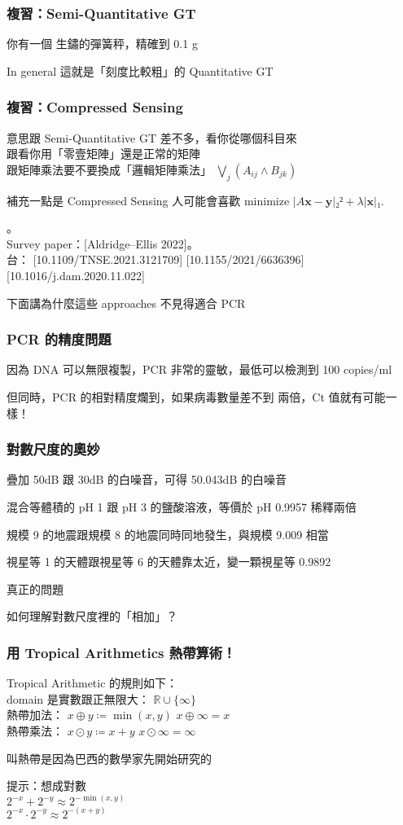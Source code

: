 \documentclass[12pt,aspectratio=1610]{beamer}
\def\pp{\pause\par}
\begin{document}
\begin{frame}\frametitle{複習：Semi-Quantitative GT}
	你有一個 \alert{生鏽的彈簧秤}，精確到 0.1 g
	\pp
	In general 這就是「刻度比較粗」的 Quantitative GT
	\par
	[Emad--Milenkovic 2014] [Cheraghchi--Gabrys--Milenkovic 2021]
\end{frame}

\begin{frame}\frametitle{複習：Compressed Sensing}
	意思跟 Semi-Quantitative GT 差不多，看你從哪個科目來 \\
	跟看你用「零壹矩陣」還是正常的矩陣 \\
	跟矩陣乘法要不要換成「邏輯矩陣乘法」 $⋁_{j} (A_{ij} ∧ B_{jk})$
	\pp
	補充一點是 Compressed Sensing 人可能會喜歡 minimize $|A𝐱 - 𝐲|₂² + λ|𝐱|₁$.
	\par
	[Ghosh et al.\ 2021] [Shental et al.\ 2020] [Mutesa et al.\ 2021]。 \\
	Survey paper：[Aldridge--Ellis 2022]。 \\
	{\small 台：
		[10.1109/TNSE.2021.3121709]
		[10.1155/2021/6636396]
		[10.1016/j.dam.2020.11.022]
	}
	\pp
	下面講為什麼這些 approaches 不見得適合 PCR
\end{frame}

\begin{frame}\frametitle{PCR 的精度問題}
	因為 DNA 可以無限複製，PCR 非常的靈敏，最低可以檢測到 \alert{100 copies/ml}
	\pp
	但同時，PCR 的相對精度爛到，如果病毒數量差不到 \alert{兩倍}，Ct 值就有可能一樣！
\end{frame}

\begin{frame}\frametitle{對數尺度的奧妙}
	疊加 50dB 跟 30dB 的白噪音，可得 50.043dB 的白噪音
	
	混合等體積的 pH 1 跟 pH 3 的鹽酸溶液，等價於 pH 0.9957 稀釋兩倍

	規模 9 的地震跟規模 8 的地震同時同地發生，與規模 9.009 相當
	
	視星等 1 的天體跟視星等 6 的天體靠太近，變一顆視星等 0.9892
\end{frame}

\begin{frame}\centering
	\huge\alert{真正的問題}

	\Huge 如何理解對數尺度裡的「相加」？
\end{frame}

\begin{frame}\frametitle{用 Tropical Arithmetics 熱帶算術！}
	Tropical Arithmetic 的規則如下： \\
	domain 是實數跟正無限大： $ℝ ∪ \{∞\}$  \\
	熱帶加法： $x ⊕ y ≔ \min(x, y)$  \hfill $x ⊕ ∞ = x$ \\
	熱帶乘法： $x ⊙ y ≔ x + y$  \hfill $x ⊙ ∞ = ∞$
	\pp
	叫熱帶是因為巴西的數學家先開始研究的
	\pp
	提示：想成對數 \\
	$2^{-x} + 2^{-y} ≈ 2^{-\min(x, y)}$\\
	$2^{-x} · 2^{-y} ≈ 2^{-(x + y)}$
\end{frame}
\end{document}
